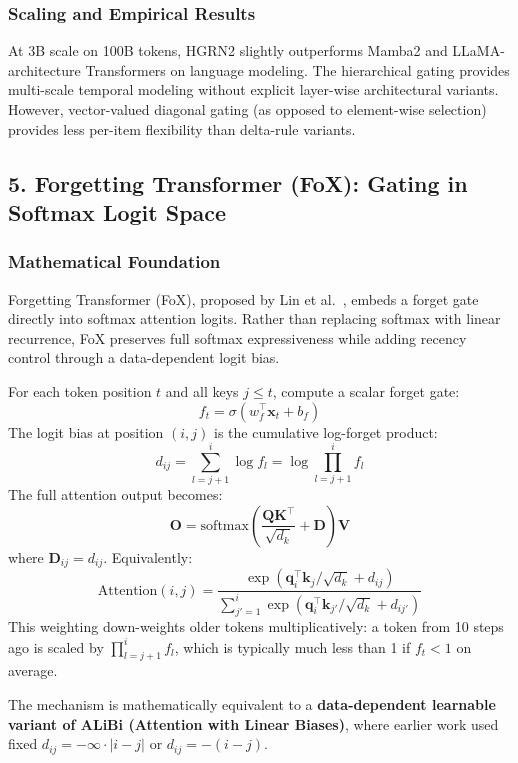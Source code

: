 \documentclass[11pt,a4paper]{article}
\begin{document}
\subsubsection{Scaling and Empirical Results}

At 3B scale on 100B tokens, HGRN2 slightly outperforms Mamba2 and LLaMA-architecture Transformers on language modeling. The hierarchical gating provides multi-scale temporal modeling without explicit layer-wise architectural variants. However, vector-valued diagonal gating (as opposed to element-wise selection) provides less per-item flexibility than delta-rule variants.

\subsection{5. Forgetting Transformer (FoX): Gating in Softmax Logit Space}

\subsubsection{Mathematical Foundation}

Forgetting Transformer (FoX), proposed by Lin et al.~\citep{lin_forgetting_transformer_2025}, embeds a forget gate directly into softmax attention logits. Rather than replacing softmax with linear recurrence, FoX preserves full softmax expressiveness while adding recency control through a data-dependent logit bias.

For each token position $t$ and all keys $j \le t$, compute a scalar forget gate:
\[
f_t = \sigma(w_f^\top \mathbf{x}_t + b_f)
\]
The logit bias at position $(i,j)$ is the cumulative log-forget product:
\[
d_{ij} = \sum_{l=j+1}^{i} \log f_l = \log \prod_{l=j+1}^{i} f_l
\]
The full attention output becomes:
\[
\mathbf{O} = \text{softmax}\left(\frac{\mathbf{Q}\mathbf{K}^\top}{\sqrt{d_k}} + \mathbf{D}\right) \mathbf{V}
\]
where $\mathbf{D}_{ij} = d_{ij}$. Equivalently:
\[
\text{Attention}(i,j) = \frac{\exp(\mathbf{q}_i^\top \mathbf{k}_j / \sqrt{d_k} + d_{ij})}{\sum_{j'=1}^{i} \exp(\mathbf{q}_i^\top \mathbf{k}_{j'} / \sqrt{d_k} + d_{ij'})}
\]
This weighting down-weights older tokens multiplicatively: a token from 10 steps ago is scaled by $\prod_{l=j+1}^{i} f_l$, which is typically much less than 1 if $f_t < 1$ on average.

The mechanism is mathematically equivalent to a \textbf{data-dependent learnable variant of ALiBi (Attention with Linear Biases)}, where earlier work used fixed $d_{ij} = -\infty \cdot |i-j|$ or $d_{ij} = -(i-j)$.
\end{document}
